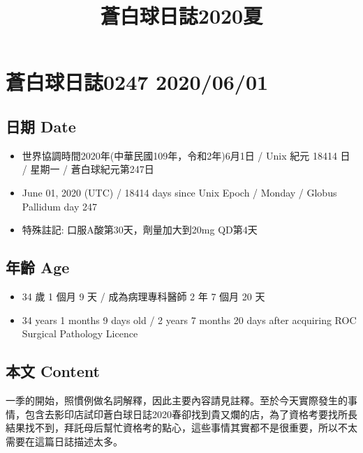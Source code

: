 \documentclass[a5paper, 11pt
]{book}
\title{蒼白球日誌2020夏}
\date{}
\providecommand{\tightlist}{%
  \setlength{\itemsep}{0pt}\setlength{\parskip}{0pt}}
\begin{document}
\clearpage\maketitle
\thispagestyle{empty}

\tableofcontents

\hypertarget{ux84bcux767dux7403ux65e5ux8a8c0247-20200601}{%
\section{蒼白球日誌0247
2020/06/01}\label{ux84bcux767dux7403ux65e5ux8a8c0247-20200601}}

\hypertarget{ux65e5ux671f-date}{%
\subsection{日期 Date}\label{ux65e5ux671f-date}}

\begin{itemize}
\tightlist
\item
  世界協調時間2020年(中華民國109年，令和2年)6月1日 / Unix 紀元 18414 日
  / 星期一 / 蒼白球紀元第247日
\item
  June 01, 2020 (UTC) / 18414 days since Unix Epoch / Monday / Globus
  Pallidum day 247
\item
  特殊註記: 口服A酸第30天，劑量加大到20mg QD第4天
\end{itemize}

\hypertarget{ux5e74ux9f61-age}{%
\subsection{年齡 Age}\label{ux5e74ux9f61-age}}

\begin{itemize}
\tightlist
\item
  34 歲 1 個月 9 天 / 成為病理專科醫師 2 年 7 個月 20 天
\item
  34 years 1 months 9 days old / 2 years 7 months 20 days after
  acquiring ROC Surgical Pathology Licence
\end{itemize}

\hypertarget{ux672cux6587-content}{%
\subsection{本文 Content}\label{ux672cux6587-content}}

一季的開始，照慣例做名詞解釋，因此主要內容請見註釋。至於今天實際發生的事情，包含去影印店試印蒼白球日誌2020春卻找到貴又爛的店，為了資格考要找所長結果找不到，拜託母后幫忙資格考的點心，這些事情其實都不是很重要，所以不太需要在這篇日誌描述太多。
\end{document}
